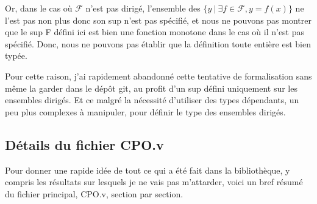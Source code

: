 \documentclass{article}
\newcommand\code[1]{{\fontfamily{lmtt}\selectfont #1}}
\theoremstyle{definition}
\begin{document}
Or, dans le cas où $\mathcal{F}$ n'est pas dirigé, l'ensemble des $\{y ~ | ~ \exists f \in \mathcal{F}, y = f(x)\}$ ne l'est pas non plus donc son sup n'est pas spécifié, et nous ne pouvons pas montrer que le \code{sup F} défini ici est bien une fonction monotone dans le cas où il n'est pas spécifié. Donc, nous ne pouvons pas établir que la définition toute entière est bien typée.

Pour cette raison, j'ai rapidement abandonné cette tentative de formalisation sans même la garder dans le dépôt git, au profit d'un sup défini uniquement sur les ensembles dirigés. Et ce malgré la nécessité d'utiliser des types dépendants, un peu plus complexes à manipuler, pour définir le type des ensembles dirigés.



\subsection{Détails du fichier CPO.v}

Pour donner une rapide idée de tout ce qui a été fait dans la bibliothèque, y compris les résultats sur lesquels je ne vais pas m'attarder, voici un bref résumé du fichier principal, \code{CPO.v}, section par section.

\medskip
\end{document}
